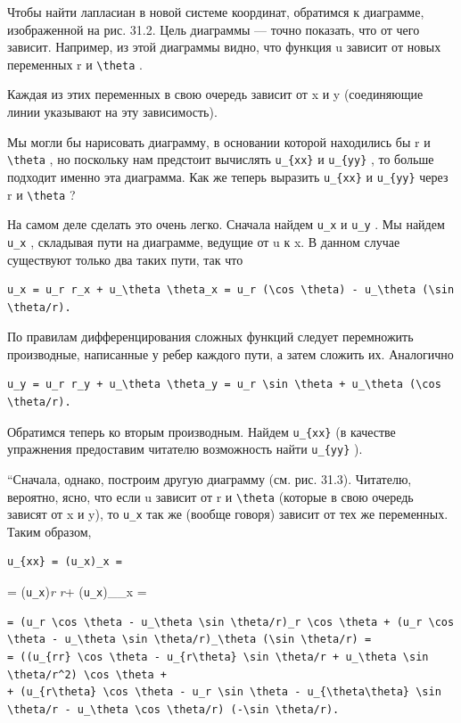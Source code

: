 \documentclass[
  ukrainian,
]{article}
\begin{document}
Чтобы найти лапласиан в новой системе координат, обратимся к диаграмме,
изображенной на рис. 31.2. Цель диаграммы --- точно показать, что от
чего зависит. Например, из этой диаграммы видно, что функция u зависит
от новых переменных r и \texttt{\textbackslash{}theta} .

Каждая из этих переменных в свою очередь зависит от x и y (соединяющие
линии указывают на эту зависимость).

Мы могли бы нарисовать диаграмму, в основании которой находились бы r и
\texttt{\textbackslash{}theta} , но поскольку нам предстоит вычислять
\texttt{u\_\{xx\}} и \texttt{u\_\{yy\}} , то больше подходит именно эта
диаграмма. Как же теперь выразить \texttt{u\_\{xx\}} и
\texttt{u\_\{yy\}} через r и \texttt{\textbackslash{}theta} ?

На самом деле сделать это очень легко. Сначала найдем \texttt{u\_x} и
\texttt{u\_y} . Мы найдем \texttt{u\_x} , складывая пути на диаграмме,
ведущие от u к x. В данном случае существуют только два таких пути, так
что

\begin{verbatim}
u_x = u_r r_x + u_\theta \theta_x = u_r (\cos \theta) - u_\theta (\sin \theta/r).
\end{verbatim}

По правилам дифференцирования сложных функций следует перемножить
производные, написанные у ребер каждого пути, а затем сложить их.
Аналогично

\begin{verbatim}
u_y = u_r r_y + u_\theta \theta_y = u_r \sin \theta + u_\theta (\cos \theta/r).
\end{verbatim}

Обратимся теперь ко вторым производным. Найдем \texttt{u\_\{xx\}} (в
качестве упражнения предоставим читателю возможность найти
\texttt{u\_\{yy\}} ).

``Сначала, однако, построим другую диаграмму (см. рис. 31.3). Читателю,
вероятно, ясно, что если u зависит от r и \texttt{\textbackslash{}theta}
(которые в свою очередь зависят от x и y), то \texttt{u\_x} так же
(вообще говоря) зависит от тех же переменных. Таким образом,

\begin{verbatim}
u_{xx} = (u_x)_x =
\end{verbatim}

= (\texttt{u\_x})\emph{r r} + (\texttt{u\_x})\_\theta \theta\_x =

\begin{verbatim}
= (u_r \cos \theta - u_\theta \sin \theta/r)_r \cos \theta + (u_r \cos \theta - u_\theta \sin \theta/r)_\theta (\sin \theta/r) =
= ((u_{rr} \cos \theta - u_{r\theta} \sin \theta/r + u_\theta \sin \theta/r^2) \cos \theta +
+ (u_{r\theta} \cos \theta - u_r \sin \theta - u_{\theta\theta} \sin \theta/r - u_\theta \cos \theta/r) (-\sin \theta/r).
\end{verbatim}
\end{document}
